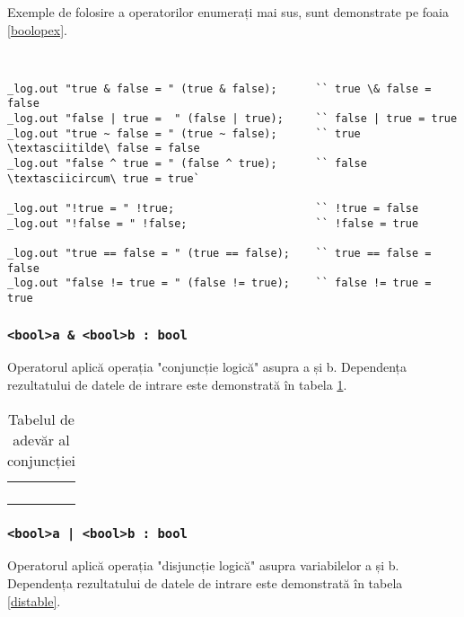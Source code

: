 Exemple de folosire a operatorilor enumerați mai sus, sunt demonstrate pe foaia \ref{boolopex}.

\

\begin{lstlisting}[caption=Exemple de folosite a operatorilor asupra tipului bool, label=boolopex]
_log.out "true & false = " (true & false);		`` true \& false = false
_log.out "false | true =  " (false | true);		`` false | true = true
_log.out "true ~ false = " (true ~ false);		`` true \textasciitilde\ false = false
_log.out "false ^ true = " (false ^ true);		`` false \textasciicircum\ true = true`

_log.out "!true = " !true;						`` !true = false
_log.out "!false = " !false;					`` !false = true

_log.out "true == false = " (true == false);	`` true == false = false
_log.out "false != true = " (false != true);	`` false != true = true
\end{lstlisting}

\subsubsection{\lstinline|<bool>a & <bool>b : bool|}

Operatorul aplică operația "conjuncție logică" asupra a și b. Dependența rezultatului de datele de intrare este demonstrată în tabela \ref{conjtable}.

\begin{table}[htb]
	\caption{Tabelul de adevăr al conjuncției}
	\label{conjtable}
	\begin{tabular}{|c|c|c|}
		\hline
		\code{a} & \code{b} & \code{a \& b} \\ \hline
		\false{} & \false{} & \false{}  	\\ \hline
		\false{} & \true{}  & \false{}  	\\ \hline
		\true{}  & \false{} & \false{}  	\\ \hline
		\true{}  & \true{}  & \true{}   	\\ \hline
	\end{tabular}
	\vspace{-2em}
\end{table}

\subsubsection{\lstinline`<bool>a | <bool>b : bool`}

Operatorul aplică operația "disjuncție logică" asupra variabilelor a și b. Dependența rezultatului de datele de intrare este demonstrată în tabela  \ref{distable}.

